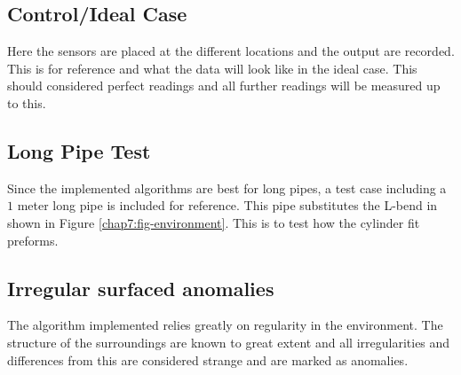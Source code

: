 \subsection{Control/Ideal Case}
Here the sensors are placed at the different locations and the output are recorded. This
is for reference and what the data will look like in the ideal case. This should
considered perfect readings and all further readings will be measured up to this.

\subsection{Long Pipe Test}
Since the implemented algorithms are best for long pipes, a test case including a
$1$ meter long pipe is included for reference. This pipe substitutes the L-bend in
shown in Figure \ref{chap7:fig-environment}. This is to test how the cylinder fit
preforms. 


\subsection{Irregular surfaced anomalies}
The algorithm implemented relies greatly on regularity in the environment. The structure
of the surroundings are known to great extent and all irregularities and differences from
this are considered strange and are marked as anomalies. 

